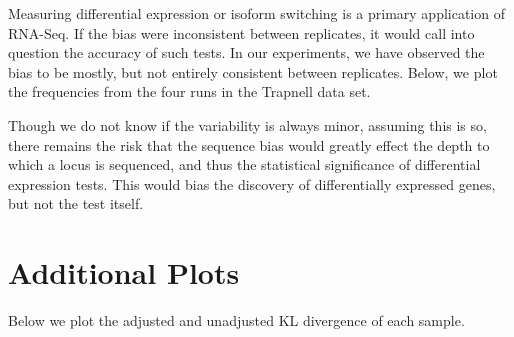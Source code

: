 \documentclass[letterpaper]{article}
\begin{document}
Measuring differential expression or isoform switching is a primary application of
RNA-Seq. If the bias were inconsistent between replicates, it would call into
question the accuracy of such tests. In our experiments, we have observed the
bias to be mostly, but not entirely consistent between replicates. Below, we
plot the frequencies from the four runs in the Trapnell data set.

\begin{comment}
\begin{center}
\texttt{[image: fig/replicates.pdf]}
\end{center}
\end{comment}

Though we do not know if the variability is always minor, assuming this is so,
there remains the risk that the sequence bias would greatly effect the depth to
which a locus is sequenced, and thus the statistical significance of
differential expression tests. This would bias the discovery of differentially
expressed genes, but not the test itself.



\section{Additional Plots}

Below we plot the adjusted and unadjusted KL divergence of each sample.

\begin{comment}
\texttt{[image: fig/kl-all.pdf]}
\end{comment}




\end{document}

